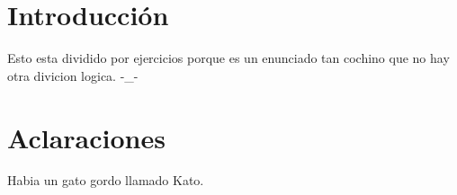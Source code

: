\section{Introducci\'on}

Esto esta dividido por ejercicios porque es un enunciado tan cochino que no hay otra divicion logica. -\_-

\section{Aclaraciones}

Habia un gato gordo llamado Kato. 